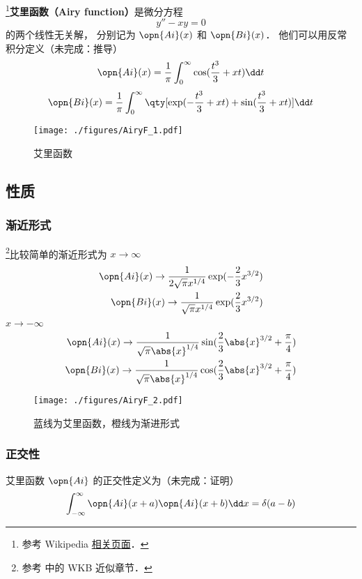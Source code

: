 
\footnote{参考 Wikipedia \href{https://en.wikipedia.org/wiki/Airy_function}{相关页面}．}\textbf{艾里函数（Airy function）}是微分方程
\begin{equation}
y'' - xy = 0
\end{equation}
的两个线性无关解， 分别记为 $\opn{Ai}(x)$ 和 $\opn{Bi}(x)$． 他们可以用反常积分定义（未完成：推导）
\begin{equation}
\opn{Ai}(x)=\frac 1\pi \int_0^\infty \cos(\frac{t^3}{3}+xt)\dd t
\end{equation}
\begin{equation}
\opn{Bi}(x)=\frac 1\pi \int_0^\infty \qty[\exp(-\frac{t^3}{3}+xt)+\sin(\frac{t^3}{3}+xt)]\dd t
\end{equation}

\begin{figure}[ht]
\centering
\texttt{[image: ./figures/AiryF\_1.pdf]}
\caption{艾里函数} \label{AiryF_fig1}
\end{figure}
\subsection{性质}
\subsubsection{渐近形式}
\footnote{参考 \cite{GriffQ} 中的 WKB 近似章节．}比较简单的渐近形式为 $x \to \infty$
\begin{align}
\opn{Ai}(x) \to \frac{1}{2\sqrt{\pi} x^{1/4}} \exp(-\frac{2}{3}x^{3/2})\\
\opn{Bi}(x) \to \frac{1}{\sqrt{\pi} x^{1/4}} \exp(\frac{2}{3}x^{3/2})
\end{align}
$x \to -\infty$
\begin{align}
\opn{Ai}(x) \to \frac{1}{\sqrt{\pi} \abs{x}^{1/4}} \sin(\frac{2}{3}\abs{x}^{3/2}+\frac{\pi}{4})\\
\opn{Bi}(x) \to \frac{1}{\sqrt{\pi} \abs{x}^{1/4}} \cos(\frac{2}{3}\abs{x}^{3/2}+\frac{\pi}{4})
\end{align}
\begin{figure}[ht]
\centering
\texttt{[image: ./figures/AiryF\_2.pdf]}
\caption{蓝线为艾里函数，橙线为渐进形式} \label{AiryF_fig2}
\end{figure}

\subsubsection{正交性}
艾里函数 $\opn{Ai}$ 的正交性定义为（未完成：证明）
\begin{equation}
\int_{-\infty}^\infty\opn{Ai}(x+a)\opn{Ai}(x+b)\dd x=\delta(a-b)
\end{equation}

